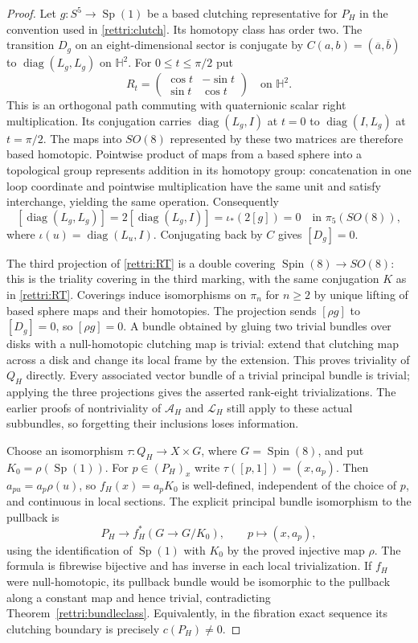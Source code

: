 \documentclass[11pt]{article}
\theoremstyle{definition}
\begin{document}
\begin{proof}
Let $g:S^5\to\operatorname{Sp}(1)$ be a based clutching
representative for $P_H$ in the convention used in
\eqref{rettri:clutch}. Its homotopy class has order two.
The transition $D_g$ on an eight-dimensional sector is conjugate
by $C(a,b)=(\overline a,\overline b)$ to
$\operatorname{diag}(L_g,L_g)$ on $\mathbb H^2$.
For $0\le t\le\pi/2$ put
\[
 R_t=\begin{pmatrix}\cos t&-\sin t\\
                       \sin t&\cos t\end{pmatrix}
       \quad\text{on }\mathbb H^2.
\]
This is an orthogonal path commuting with quaternionic scalar
right multiplication. Its conjugation carries
$\operatorname{diag}(L_g,I)$ at $t=0$ to
$\operatorname{diag}(I,L_g)$ at $t=\pi/2$. The maps into $SO(8)$
represented by these two matrices are therefore based homotopic.
Pointwise product of maps from a based sphere into a topological
group represents addition in its homotopy group: concatenation
in one loop coordinate and pointwise multiplication have the
same unit and satisfy interchange, yielding the same operation.
Consequently
\[
 [\operatorname{diag}(L_g,L_g)]
 =2[\operatorname{diag}(L_g,I)]
 =\iota_*(2[g])=0\quad\text{in }\pi_5(SO(8)),
\]
where $\iota(u)=\operatorname{diag}(L_u,I)$. Conjugating back by
$C$ gives $[D_g]=0$.

The third projection of \eqref{rettri:RT} is a double covering
$\operatorname{Spin}(8)\to SO(8)$: this is the triality covering
in the third marking, with the same conjugation $K$ as in
\eqref{rettri:RT}. Coverings induce isomorphisms on
$\pi_n$ for $n\ge2$ by unique lifting of based sphere maps and
their homotopies. The projection sends $[\rho g]$ to $[D_g]=0$,
so $[\rho g]=0$. A bundle obtained by gluing two trivial bundles
over disks with a null-homotopic clutching map is trivial: extend
that clutching map across a disk and change its local frame by
the extension. This proves triviality of $Q_H$ directly.
Every associated vector bundle of a trivial principal bundle is
trivial; applying the three projections gives the asserted
rank-eight trivializations. The earlier proofs of nontriviality
of $\mathcal A_H$ and $\mathcal L_H$ still apply to these actual
subbundles, so forgetting their inclusions loses information.

Choose an isomorphism $\tau:Q_H\to X\times G$, where
$G=\operatorname{Spin}(8)$, and put $K_0=\rho(\operatorname{Sp}(1))$.
For $p\in(P_H)_x$ write $\tau([p,1])=(x,a_p)$. Then
$a_{pu}=a_p\rho(u)$, so
$f_H(x)=a_p K_0$ is well-defined, independent of the choice of
$p$, and continuous in local sections. The explicit principal
bundle isomorphism to the pullback is
\[
 P_H\longrightarrow f_H^*(G\to G/K_0),\qquad
 p\longmapsto(x,a_p),
\]
using the identification of $\operatorname{Sp}(1)$ with $K_0$
by the proved injective map $\rho$. The formula is fibrewise
bijective and has inverse in each local trivialization.
If $f_H$ were null-homotopic, its pullback bundle would be
isomorphic to the pullback along a constant map and hence
trivial, contradicting Theorem~\ref{rettri:bundleclass}.
Equivalently, in the fibration exact sequence its clutching
boundary is precisely $c(P_H)\ne0$.
\end{proof}
\end{document}
